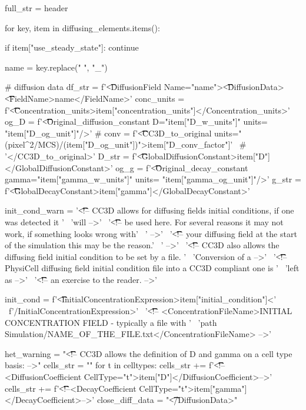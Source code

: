 \begin{python}
    full_str = header

    for key, item in diffusing_elements.items():

        if item["use_steady_state"]:
            continue

        name = key.replace(" ", "_")

        # diffusion data
        df_str = f'\t\t<DiffusionField Name="{name}">\n\t\t\t<DiffusionData>\n\t\t\t\t<FieldName>{name}</FieldName>\n'
        conc_units = f'\t\t\t\t<Concentration_units>{item["concentration_units"]}</Concentration_units>\n'
        og_D = f'\t\t\t\t<Original_diffusion_constant D="{item["D_w_units"]}" units= "{item["D_og_unit"]}"/>\n'
        # conv = f'\t\t\t\t<CC3D_to_original units="(pixel^2/MCS)/(item["D_og_unit"])">{item["D_conv_factor"]}' \
        #        '</CC3D_to_original>'
        D_str = f'\t\t\t\t<GlobalDiffusionConstant>{item["D"]}</GlobalDiffusionConstant>\n'
        og_g = f'\t\t\t\t<Original_decay_constant gamma="{item["gamma_w_units"]}" units= "{item["gamma_og_unit"]}"/>\n'
        g_str = f'\t\t\t\t<GlobalDecayConstant>{item["gamma"]}</GlobalDecayConstant>\n'

        init_cond_warn = '\t\t\t\t<!-- CC3D allows for diffusing fields initial conditions, if one was detected it ' \
                         'will -->\n' \
                         '\t\t\t\t<!-- be used here. For several reasons it may not work, if something looks wrong with' \
                         ' -->\n' \
                         '\t\t\t\t<!-- your diffusing field at the start of the simulation this may be the reason.' \
                         ' -->\n' \
                         '\t\t\t\t<!-- CC3D also allows the diffusing field initial condition to be set by a file. ' \
                         'Conversion of a -->\n' \
                         '\t\t\t\t<!-- PhysiCell diffusing field initial condition file into a CC3D compliant one is ' \
                         'left as -->\n' \
                         '\t\t\t\t<!-- an exercise to the reader. -->\n'

        init_cond = f'\t\t\t\t <InitialConcentrationExpression>{item["initial_condition"]}<' \
            f'/InitialConcentrationExpression>' \
            '\n\t\t\t\t<!-- <ConcentrationFileName>INITIAL CONCENTRATION FIELD - typically a file with ' \
            'path Simulation/NAME_OF_THE_FILE.txt</ConcentrationFileName> -->'

        het_warning = "\n\t\t\t\t<!-- CC3D allows the definition of D and gamma on a cell type basis: -->\n"
        cells_str = ""
        for t in celltypes:
            cells_str += f'\t\t\t\t<!--<DiffusionCoefficient CellType="{t}">{item["D"]}</DiffusionCoefficient>-->\n'
            cells_str += f'\t\t\t\t<!--<DecayCoefficient CellType="{t}">{item["gamma"]}</DecayCoefficient>-->\n'
        close_diff_data = "\t\t\t</DiffusionData>\n"


\end{python}
